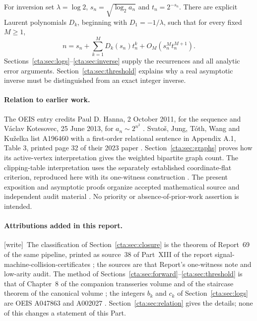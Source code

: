 \documentclass[11pt]{article}
\theoremstyle{definition}
\theoremstyle{remark}
\newcommand{\la}{\lambda}
\newcommand{\wtag}{\textup{[write]}}
\begin{document}
For inversion set $\la=\log 2$, $s_n=\sqrt{\log_2 a_n}$ and $t_n=2^{-s_n}$.
There are explicit Laurent polynomials $D_k$, beginning with
$D_1=-1/\la$, such that for every fixed $M\geq1$,
\begin{equation}\label{cta:eq:maininverse}
 n=s_n+\sum_{k=1}^M D_k(s_n)t_n^k
      +O_M\!\left(s_n^M t_n^{M+1}\right).
\end{equation}
Sections~\ref{cta:sec:logs}--\ref{cta:sec:inverse} supply the recurrences and all
analytic error arguments. Section~\ref{cta:sec:threshold} explains why a
real asymptotic inverse must be distinguished from an exact integer inverse.

\paragraph{Relation to earlier work.}
The OEIS entry credits Paul D. Hanna, 2 October 2011, for the sequence
and V\'aclav Kotesovec, 25 June 2013, for $a_n\sim2^{n^2}$ \cite{oeis}.
Svato\v{s}, Jung, T\'oth, Wang and Ku\v{z}elka list A196460 with a
first-order relational sentence in Appendix A.1, Table 3, printed page 32
of their 2023 paper \cite{svatos}. Section~\ref{cta:sec:graphs} proves how
its active-vertex interpretation gives the weighted bipartite graph count.
The clipping-table interpretation uses the separately established
coordinate-flat criterion, reproduced here with its one-witness construction
\cite{native,lowaudit}. The present exposition and asymptotic proofs
organize accepted mathematical source and independent audit material
\cite{source,audit}. No priority or absence-of-prior-work assertion is intended.

\paragraph{Attributions added in this report.} \wtag\ The classification
of Section~\ref{cta:sec:closure} is the theorem of Report~69 of the same
pipeline, printed as source~38 of Part~XIII of the report
signal-machine-collision-certificates \cite{smc}; the sources
\cite{native,lowaudit} are that Report's one-witness note and low-arity
audit. The method of Sections~\ref{cta:sec:forward}--\ref{cta:sec:threshold}
is that of Chapter~8 of the companion transseries volume \cite{cti} and of
the staircase theorem of the canonical volume \cite{tsvol}; the integers
$b_k$ and $c_k$ of Section~\ref{cta:sec:logs} are OEIS A047863 and A002027
\cite{colored,connected}. Section~\ref{cta:sec:relation} gives the details;
none of this changes a statement of this Part.
\end{document}
